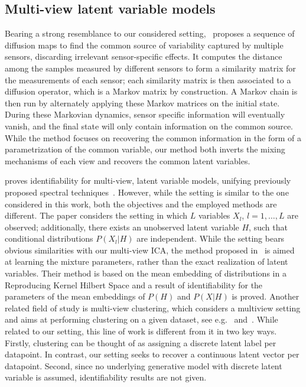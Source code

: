 \subsection{Multi-view latent variable models}


Bearing a strong resemblance to our considered setting,~\cite{lederman2018learning} proposes a sequence of diffusion maps to find the common source of variability captured by multiple sensors, discarding irrelevant sensor-specific effects.
It computes the distance among the samples measured by different sensors to form a similarity matrix for the measurements of each sensor; each similarity matrix is then associated to a diffusion operator, which is a Markov matrix by construction. A Markov chain is then run by alternately applying these Markov matrices on the initial state. During these Markovian dynamics, sensor specific information will eventually vanish, and the final state will only contain information on the common source.
While the method focuses on recovering the common information in the form of a parametrization of the common variable, our method both inverts the mixing mechanisms of each view and recovers the common latent variables.

\cite{song2014nonparametric} proves identifiability for multi-view, latent variable models, unifying previously proposed spectral techniques~\cite{anandkumar2014tensor}. However, while the setting is similar to the one considered in this work, both the objectives and the employed methods are different.
The paper considers the setting in which $L$ variables $X_l$, $l=1, \ldots, L$ are observed; additionally, there exists an unobserved latent variable $H$, such that conditional distributions $P(X_l|H)$ are independent. While the setting bears obvious similarities with our multi-view ICA, the method proposed in~\cite{song2014nonparametric} is aimed at learning the mixture parameters, rather than the exact realization of latent variables.
Their method is based on the mean embedding of distributions in a Reproducing Kernel Hilbert Space and a result of identifiability for the parameters of the mean embeddings of $P(H)$ and $P(X|H)$ is proved.
Another related field of study is multi-view clustering, which considers a multiview setting and aims at performing clustering on a given dataset, see e.g.~\cite{de2005spectral} and~\cite{kumar2011co}. While related to our setting, this line of work is different from it in two key ways.
Firstly, clustering can be thought of as assigning a discrete latent label per datapoint. In contrast, our setting seeks to recover a continuous latent vector per datapoint.
Second, since no underlying generative model with discrete latent variable is assumed, identifiability results are not given.



